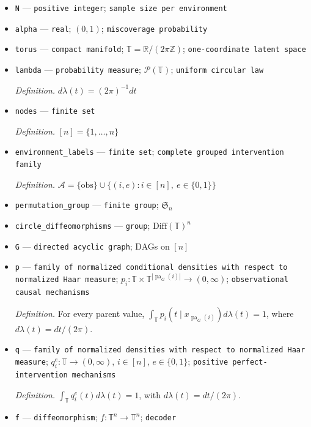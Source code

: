 \documentclass{article}
\begin{document}
\begin{itemize}
  \item \texttt{N} --- \texttt{positive integer}; \texttt{sample size per environment}
  \item \texttt{alpha} --- \texttt{real}; \((0,1)\); \texttt{miscoverage probability}
  \item \texttt{torus} --- \texttt{compact manifold}; \(\mathbb T=\mathbb R/(2\pi\mathbb Z)\); \texttt{one-\allowbreak{}coordinate latent space}
  \item \texttt{lambda} --- \texttt{probability measure}; \(\mathcal P(\mathbb T)\); \texttt{uniform circular law}
  \par\smallskip\noindent\emph{Definition.} \(d\lambda(t)=(2\pi)^{-1}dt\)
  \item \texttt{nodes} --- \texttt{finite set}
  \par\smallskip\noindent\emph{Definition.} \([n]=\{1,\ldots,n\}\)
  \item \texttt{environment\_\allowbreak{}labels} --- \texttt{finite set}; \texttt{complete grouped intervention family}
  \par\smallskip\noindent\emph{Definition.} \(\mathcal A=\{\mathrm{obs}\}\cup\{(i,e):i\in[n],\ e\in\{0,1\}\}\)
  \item \texttt{permutation\_\allowbreak{}group} --- \texttt{finite group}; \(\mathfrak S_n\)
  \item \texttt{circle\_\allowbreak{}diffeomorphisms} --- \texttt{group}; \(\mathrm{Diff}(\mathbb T)^n\)
  \item \texttt{G} --- \texttt{directed acyclic graph}; DAGs on \([n]\)
  \item \texttt{p} --- \texttt{family of normalized conditional densities with respect to normalized Haar measure}; \(p_i:\mathbb T\times\mathbb T^{|\operatorname{pa}_G(i)|}\to(0,\infty)\); \texttt{observational causal mechanisms}
  \par\smallskip\noindent\emph{Definition.} For every parent value, \(\int_{\mathbb T}p_i(t\mid x_{\operatorname{pa}_G(i)})d\lambda(t)=1\), where \(d\lambda(t)=dt/(2\pi)\).
  \item \texttt{q} --- \texttt{family of normalized densities with respect to normalized Haar measure}; \(q_i^e:\mathbb T\to(0,\infty)\), \(i\in[n]\), \(e\in\{0,1\}\); \texttt{positive perfect-\allowbreak{}intervention mechanisms}
  \par\smallskip\noindent\emph{Definition.} \(\int_{\mathbb T}q_i^e(t)d\lambda(t)=1\), with \(d\lambda(t)=dt/(2\pi)\).
  \item \texttt{f} --- \texttt{diffeomorphism}; \(f:\mathbb T^n\to\mathbb T^n\); \texttt{decoder}

\end{itemize}
\end{document}

